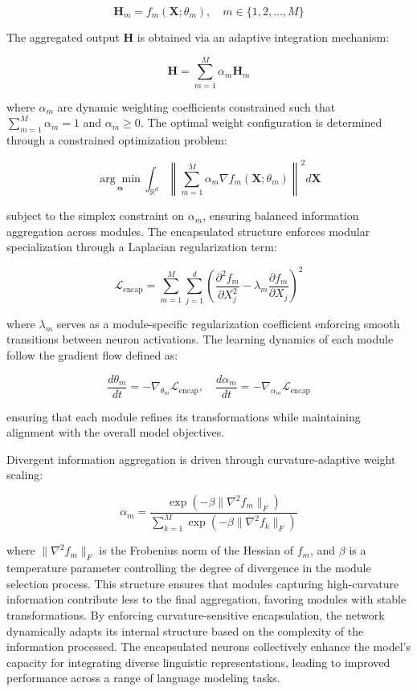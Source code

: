 \documentclass{article}
\begin{document}
\[
\mathbf{H}_m = f_m(\mathbf{X}; \theta_m), \quad m \in \{1,2,\dots,M\}
\]

The aggregated output \( \mathbf{H} \) is obtained via an adaptive integration mechanism:

\[
\mathbf{H} = \sum_{m=1}^{M} \alpha_m \mathbf{H}_m
\]

where \( \alpha_m \) are dynamic weighting coefficients constrained such that \( \sum_{m=1}^{M} \alpha_m = 1 \) and \( \alpha_m \geq 0 \). The optimal weight configuration is determined through a constrained optimization problem:

\[
\underset{\boldsymbol{\alpha}}{\arg \min} \int_{\mathbb{R}^{d}} \left\| \sum_{m=1}^{M} \alpha_m \nabla f_m(\mathbf{X}; \theta_m) \right\|^2 d\mathbf{X}
\]

subject to the simplex constraint on \( \alpha_m \), ensuring balanced information aggregation across modules. The encapsulated structure enforces modular specialization through a Laplacian regularization term:

\[
\mathcal{L}_{\text{encap}} = \sum_{m=1}^{M} \sum_{j=1}^{d} \left( \frac{\partial^2 f_m}{\partial X_j^2} - \lambda_m \frac{\partial f_m}{\partial X_j} \right)^2
\]

where \( \lambda_m \) serves as a module-specific regularization coefficient enforcing smooth transitions between neuron activations. The learning dynamics of each module follow the gradient flow defined as:

\[
\frac{d \theta_m}{dt} = - \nabla_{\theta_m} \mathcal{L}_{\text{encap}}, \quad \frac{d \alpha_m}{dt} = - \nabla_{\alpha_m} \mathcal{L}_{\text{encap}}
\]

ensuring that each module refines its transformations while maintaining alignment with the overall model objectives. 

Divergent information aggregation is driven through curvature-adaptive weight scaling:

\[
\alpha_m = \frac{\exp(-\beta \|\nabla^2 f_m\|_F)}{\sum_{k=1}^{M} \exp(-\beta \|\nabla^2 f_k\|_F)}
\]

where \( \|\nabla^2 f_m\|_F \) is the Frobenius norm of the Hessian of \( f_m \), and \( \beta \) is a temperature parameter controlling the degree of divergence in the module selection process. This structure ensures that modules capturing high-curvature information contribute less to the final aggregation, favoring modules with stable transformations. By enforcing curvature-sensitive encapsulation, the network dynamically adapts its internal structure based on the complexity of the information processed. The encapsulated neurons collectively enhance the model’s capacity for integrating diverse linguistic representations, leading to improved performance across a range of language modeling tasks.
\end{document}
